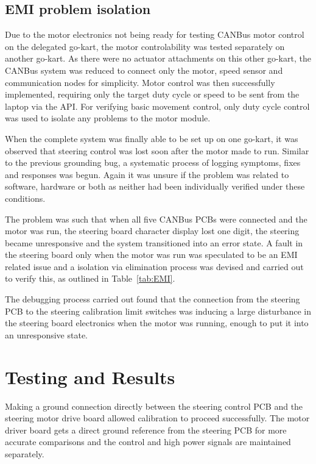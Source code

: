 \documentclass{ENZCon}
\begin{document}
\subsection{EMI problem isolation}

Due to the motor electronics not being ready for testing CANBus motor control on the delegated go-kart, the motor controlability was tested separately on another go-kart. As there were no actuator attachments on this other go-kart, the CANBus system was reduced to connect only the motor, speed sensor and communication nodes for simplicity. Motor control was then successfully implemented, requiring only the target duty cycle or speed to be sent from the laptop via the API. For verifying basic movement control, only duty cycle control was used to isolate any problems to the motor module. 


When the complete system was finally able to be set up on one go-kart, it was observed that steering control was lost soon after the motor made to run. Similar to the previous grounding bug, a systematic process of logging symptoms, fixes and responses was begun. Again it was unsure if the problem was related to software, hardware or both as neither had been individually verified under these conditions. 

The problem was such that when all five CANBus PCBs were connected and the motor was run, the steering board character display lost one digit, the steering became unresponsive and the system transitioned into an error state. A fault in the steering board only when the motor was run was speculated to be an EMI related issue and a isolation via elimination process was devised and carried out to verify this, as outlined in Table~\ref{tab:EMI}.



The debugging process carried out found that the connection from the steering PCB to the steering calibration limit switches was inducing a large disturbance in the steering board electronics when the motor was running, enough to put it into an unresponsive state.


\section{Testing and Results}

Making a ground connection directly between the steering control PCB and the steering motor drive board allowed calibration to proceed successfully. The motor driver board gets a direct ground reference from the steering PCB for more accurate comparisons and the control and high power signals are maintained separately. 
\end{document}
